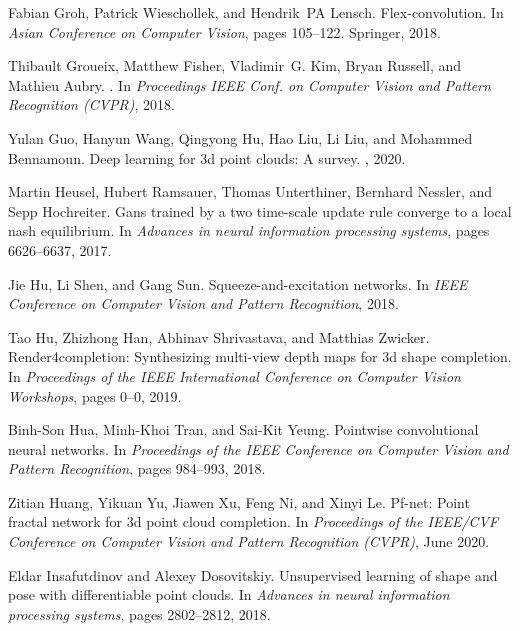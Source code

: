 \documentclass[final]{cvpr}
\begin{document}
{\begin{thebibliography}{10}
Fabian Groh, Patrick Wieschollek, and Hendrik~PA Lensch.
\newblock Flex-convolution.
\newblock In {\em Asian Conference on Computer Vision}, pages 105--122.
  Springer, 2018.

Thibault Groueix, Matthew Fisher, Vladimir~G. Kim, Bryan Russell, and Mathieu
  Aubry.
.
\newblock In {\em Proceedings IEEE Conf. on Computer Vision and Pattern
  Recognition (CVPR)}, 2018.

Yulan Guo, Hanyun Wang, Qingyong Hu, Hao Liu, Li Liu, and Mohammed Bennamoun.
\newblock Deep learning for 3d point clouds: A survey.
,
  2020.

Martin Heusel, Hubert Ramsauer, Thomas Unterthiner, Bernhard Nessler, and Sepp
  Hochreiter.
\newblock Gans trained by a two time-scale update rule converge to a local nash
  equilibrium.
\newblock In {\em Advances in neural information processing systems}, pages
  6626--6637, 2017.

Jie Hu, Li Shen, and Gang Sun.
\newblock Squeeze-and-excitation networks.
\newblock In {\em IEEE Conference on Computer Vision and Pattern Recognition},
  2018.

Tao Hu, Zhizhong Han, Abhinav Shrivastava, and Matthias Zwicker.
\newblock Render4completion: Synthesizing multi-view depth maps for 3d shape
  completion.
\newblock In {\em Proceedings of the IEEE International Conference on Computer
  Vision Workshops}, pages 0--0, 2019.

Binh-Son Hua, Minh-Khoi Tran, and Sai-Kit Yeung.
\newblock Pointwise convolutional neural networks.
\newblock In {\em Proceedings of the IEEE Conference on Computer Vision and
  Pattern Recognition}, pages 984--993, 2018.

Zitian Huang, Yikuan Yu, Jiawen Xu, Feng Ni, and Xinyi Le.
\newblock Pf-net: Point fractal network for 3d point cloud completion.
\newblock In {\em Proceedings of the IEEE/CVF Conference on Computer Vision and
  Pattern Recognition (CVPR)}, June 2020.

Eldar Insafutdinov and Alexey Dosovitskiy.
\newblock Unsupervised learning of shape and pose with differentiable point
  clouds.
\newblock In {\em Advances in neural information processing systems}, pages
  2802--2812, 2018.


\end{thebibliography}}
\end{document}
